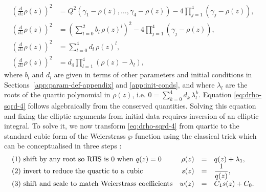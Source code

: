 \documentclass[11pt,a4paper]{article}
\begin{document}
\begin{align}
\left(\frac{d}{d z} \rho{\left(z \right)}\right)^{2} &= Q^{2}{\left({\gamma}_{1} - \rho{\left(z \right)}, \dots, {\gamma}_{4}  - \rho{\left(z \right)}\right)} - 4 \prod_{j=1}^{4} \left({\gamma}_{j} - \rho{\left(z \right)}\right), \label{eq:drho-sqrd-1} \\
\left(\frac{d}{d z} \rho{\left(z \right)}\right)^{2} &=  \left(\sum_{l=0}^{2}b_l\,\rho\left(z\right)^l\right)^{2} - 4 \prod_{j=1}^{4} \left({\gamma}_{j} - \rho{\left(z \right)}\right), \label{eq:drho-sqrd-2} \\
\left(\frac{d}{d z} \rho{\left(z \right)}\right)^{2} &= \sum_{l=0}^{4}d_l\,\rho\left(z\right)^l, \label{eq:drho-sqrd-3} \\
\left(\frac{d}{d z} \rho{\left(z \right)}\right)^{2} &= d_4 \prod_{l=1}^{4} \left(\rho\left(z\right) -  \lambda_l\right), \label{eq:drho-sqrd-4}
\end{align}
where $b_l$ and $d_l$ are given in terms of other parameters and initial conditions in Sections~\ref{app:param-def-appendix} and \ref{app:init-conds}, and where $\lambda_l$ are the roots of the quartic polynomial in $\rho(z)$, i.e. $0=\sum_{k=0}^{4}d_k\,\lambda_{l}^k$.
Equation \eqref{eq:drho-sqrd-4} follows algebraically from the conserved quantities.
Solving this equation and fixing the elliptic arguments from initial data requires inversion of an elliptic integral.
To solve it, we now transform \eqref{eq:drho-sqrd-4} from quartic to the standard cubic form of the Weierstrass $\wp$ function using the classical trick which can be conceptualised in three steps \cite{whittakerCourseModernAnalysis2021}:
\begin{equation}
\label{eq:wp-4-to-3}
\begin{array}{l rcl}
\text{(1) shift by any root so RHS is 0 when $q(z)=0$}
& \rho(z) &=& q(z) + \lambda_1,\\
\text{(2) invert to reduce the quartic to a cubic}
& s(z) &=& \dfrac{1}{q(z)},\\
\text{(3) shift and scale to match Weierstrass coefficients}
& w(z) &=& C_1 s(z) + C_0.
\end{array}
\end{equation}
\end{document}
